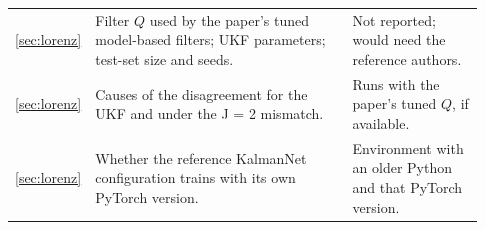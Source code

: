 \documentclass[11pt,a4paper]{article}
\begin{document}
\begin{longtable}{p{0.1\linewidth}p{0.55\linewidth}p{0.28\linewidth}}
\ref{sec:lorenz} & Filter $Q$ used by the paper's tuned model-based filters; UKF parameters; test-set size and seeds. & Not reported; would need the reference authors.\\
\ref{sec:lorenz} & Causes of the disagreement for the UKF and under the J = 2 mismatch. & Runs with the paper's tuned $Q$, if available.\\
\ref{sec:lorenz} & Whether the reference KalmanNet configuration trains with its own PyTorch version. & Environment with an older Python and that PyTorch version.\\
\bottomrule
\end{longtable}
\end{document}
